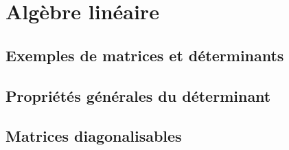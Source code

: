 \section{Algèbre linéaire} 
\newcommand{\alglin}{/home/robin/ENSEIGN/Cours/MathBiologie/L3-ENS-Math1/Exercices/AlgLin}

\subsection{Exemples de matrices et déterminants}%

% 

% 



\subsection{Propriétés générales du déterminant}%





\subsection{Matrices diagonalisables}%

% 


